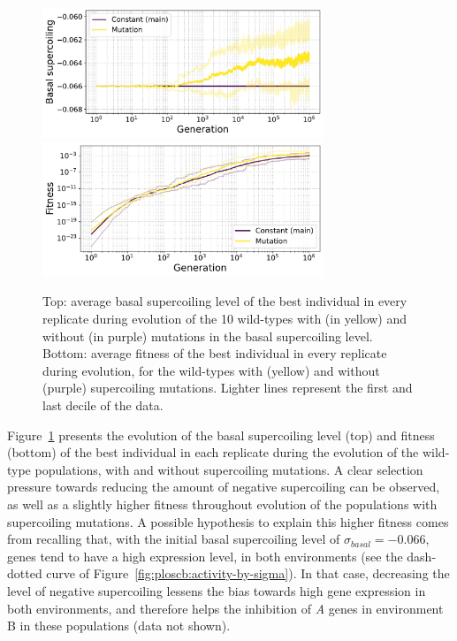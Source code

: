 \begin{figure}
\centering
\includegraphics[width=0.75\textwidth]{epistasis/img/basal_sc_all.pdf}
\includegraphics[width=0.75\textwidth]{epistasis/img/fitness_all_with_main.pdf}
\caption[Average basal supercoiling and fitness during evolution of the wild-types, with basal supercoiling level mutations]{Top: average basal supercoiling level of the best individual in every replicate during evolution of the 10 wild-types with (in yellow) and without (in purple) mutations in the basal supercoiling level.
Bottom: average fitness of the best individual in every replicate during evolution, for the wild-types with (yellow) and without (purple) supercoiling mutations.
Lighter lines represent the first and last decile of the data.}
\label{fig:epistasis:wt-evolution}
\end{figure}

Figure~\ref{fig:epistasis:wt-evolution} presents the evolution of the basal supercoiling level (top) and fitness (bottom) of the best individual in each replicate during the evolution of the wild-type populations, with and without supercoiling mutations.
A clear selection pressure towards reducing the amount of negative supercoiling can be observed, as well as a slightly higher fitness throughout evolution of the populations with supercoiling mutations.
A possible hypothesis to explain this higher fitness comes from recalling that, with the initial basal supercoiling level of $\sigma_{basal} = -0.066$, genes tend to have a high expression level, in both environments (see the dash-dotted curve of Figure~\ref{fig:ploscb:activity-by-sigma}).
In that case, decreasing the level of negative supercoiling lessens the bias towards high gene expression in both environments, and therefore helps the inhibition of \emph{A} genes in environment B in these populations (data not shown).

